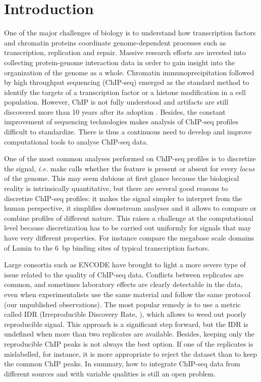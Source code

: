 \documentclass{bioinfo}
\begin{document}
\section{Introduction}
One of the major challenges of biology is to understand how transcription
factors and chromatin proteins coordinate genome-dependent processes
such as transcription, replication and repair. Massive research efforts
are invested into collecting protein-genome interaction data in order
to gain insight into the organization of the genome as a whole. Chromatin
immunoprecipitation followed by high throughput sequencing (ChIP-seq)
emerged as the standard method to identify the targets of a transcription
factor or a histone modification in a cell population. However, ChIP is not
fully understood and artifacts are still discovered more than 10 years after
its adoption \citep{pmid24349523, pmid24173036}. Besides, the constant
improvement of sequencing technologies makes analysis of ChIP-seq profiles
difficult to standardize. There is thus a continuous need to develop and
improve computational tools to analyse ChIP-seq data.

One of the most common analyses performed on ChIP-seq profiles is to
discretize the signal, \textit{i.e.} make calls whether the feature is
present or absent for every \textit{locus} of the genome. This may seem
dubious at first glance because the biological reality is intrinsically
quantitative, but there are several good reasons to discretize ChIP-seq
profiles: it makes the signal simpler to interpret from the human
perspective, it simplifies downstream analyses and it allows to compare or
combine profiles of different nature. This raises a challenge at the
computational level because discretization has to be carried out uniformly
for signals that may have very different properties. For instance compare
the megabase scale domains of Lamin \citep{pmid18463634} to the 6~bp
binding sites of typical transcription factors.

Large consortia such as ENCODE have brought to light a more severe type
of issue related to the quality of ChIP-seq data. Conflicts between
replicates are common, and
sometimes laboratory effects are clearly detectable in the data,
even when experimentalists use the same material and follow the same
protocol (our unpublished observations). The most popular remedy is to
use a metric called IDR (Irreproducible Discovery Rate, \citealp{li2011}),
which allows to weed
out poorly reproducible signal. This approach is a significant step
forward, but the IDR is undefined when more than two replicates are
available. Besides, keeping only the reproducible ChIP peaks is not
always the best option. If one of the replicates is mislabelled,
for instance, it is more appropriate to reject the dataset than to keep
the common ChIP peaks. In summary, how to integrate ChIP-seq data
from different sources and with variable qualities is still an open
problem.
\end{document}
